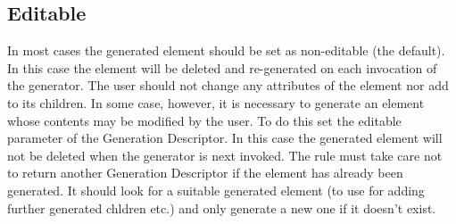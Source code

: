 \subsection{Editable}
\label{sec:editable}
In most cases the generated element should be set as non-editable (the default). In this case the element will be deleted and re-generated on each invocation of the generator. The user should not change any attributes of the element nor add to its children. In some case, however, it is necessary to generate an element whose contents may be modified by the user. To do this set the editable parameter of the Generation Descriptor. In this case the generated element will not be deleted when the generator is next invoked. The rule must take care not to return another Generation Descriptor if the element has already been generated. It should look for a suitable generated element (to use for adding further generated chldren etc.) and only generate a new one if it doesn't exist.

%
%


